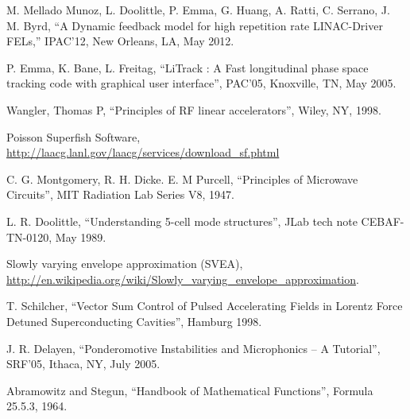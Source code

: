 \documentclass[a4paper,12pt]{article}
\begin{document}
\newpage

\begin{thebibliography}{19}   %

M. Mellado Munoz, L. Doolittle, P. Emma, G. Huang, A. Ratti, C. Serrano, J. M. Byrd, ``A Dynamic feedback model for high repetition rate LINAC-Driver FELs,''
IPAC'12, New Orleans, LA, May 2012.

P. Emma, K. Bane, L. Freitag, ``LiTrack : A Fast longitudinal phase space tracking code with graphical user interface'', PAC'05,  Knoxville, TN, May 2005.

Wangler, Thomas P, ``Principles of RF linear accelerators'', Wiley, NY, 1998.

Poisson Superfish Software, \url{http://laacg.lanl.gov/laacg/services/download_sf.phtml}

C. G. Montgomery, R. H. Dicke. E. M Purcell, ``Principles of Microwave Circuits'', MIT Radiation Lab Series V8, 1947.

L. R. Doolittle, ``Understanding 5-cell mode structures'', JLab tech note CEBAF-TN-0120, May 1989.

Slowly varying envelope approximation (SVEA), \url{http://en.wikipedia.org/wiki/Slowly_varying_envelope_approximation}.

T. Schilcher, ``Vector Sum Control of Pulsed Accelerating Fields in Lorentz Force Detuned Superconducting Cavities'', Hamburg 1998.

J. R. Delayen, ``Ponderomotive Instabilities and Microphonics -- A Tutorial'', SRF'05, Ithaca, NY, July 2005.

Abramowitz and Stegun, ``Handbook of Mathematical Functions'', Formula 25.5.3, 1964.


\end{thebibliography}
\end{document}
